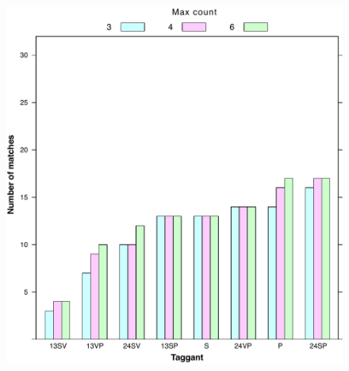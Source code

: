 \documentclass[thesis.tex]{subfiles}
\begin{document}
\begin{figure}[h]
\centering \includegraphics[page=7,width=\textwidth,height=\textheight,keepaspectratio=true]{images/experiment/tags_configs}
\end{figure}
\end{document}
